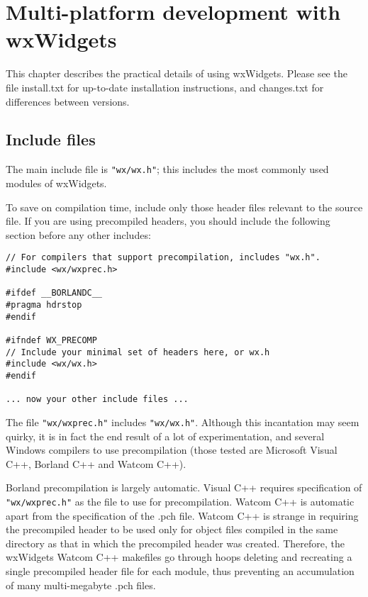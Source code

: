 \chapter{Multi-platform development with wxWidgets}\label{multiplat}
%
\setfooter{\thepage}{}{}{}{}{\thepage}%

This chapter describes the practical details of using wxWidgets. Please
see the file install.txt for up-to-date installation instructions, and
changes.txt for differences between versions.

\section{Include files}

The main include file is {\tt "wx/wx.h"}; this includes the most commonly
used modules of wxWidgets.

To save on compilation time, include only those header files relevant to the
source file. If you are using precompiled headers, you should include
the following section before any other includes:

\begin{verbatim}
// For compilers that support precompilation, includes "wx.h".
#include <wx/wxprec.h>

#ifdef __BORLANDC__
#pragma hdrstop
#endif

#ifndef WX_PRECOMP
// Include your minimal set of headers here, or wx.h
#include <wx/wx.h>
#endif

... now your other include files ...
\end{verbatim}

The file {\tt "wx/wxprec.h"} includes {\tt "wx/wx.h"}. Although this incantation
may seem quirky, it is in fact the end result of a lot of experimentation,
and several Windows compilers to use precompilation (those tested are Microsoft Visual C++, Borland C++
and Watcom C++).

Borland precompilation is largely automatic. Visual C++ requires specification of {\tt "wx/wxprec.h"} as
the file to use for precompilation. Watcom C++ is automatic apart from the specification of
the .pch file. Watcom C++ is strange in requiring the precompiled header to be used only for
object files compiled in the same directory as that in which the precompiled header was created.
Therefore, the wxWidgets Watcom C++ makefiles go through hoops deleting and recreating
a single precompiled header file for each module, thus preventing an accumulation of many
multi-megabyte .pch files.

